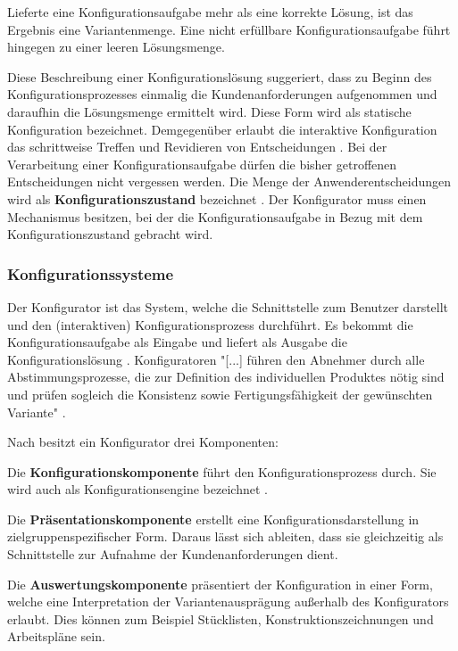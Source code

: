 \documentclass[12pt,a4paper,bibliography=totocnumbered,listof=totoc]{scrartcl}
\begin{document}
Lieferte eine Konfigurationsaufgabe mehr als eine korrekte Lösung, ist das Ergebnis eine Variantenmenge. Eine nicht erfüllbare Konfigurationsaufgabe führt hingegen zu einer leeren Lösungsmenge.

Diese Beschreibung einer Konfigurationslösung suggeriert, dass zu Beginn des Konfigurationsprozesses einmalig die Kundenanforderungen aufgenommen und daraufhin die Lösungsmenge ermittelt wird. Diese Form wird als statische Konfiguration bezeichnet. Demgegenüber erlaubt die interaktive Konfiguration das schrittweise Treffen und Revidieren von Entscheidungen \citep{hadzic04}. Bei der Verarbeitung einer Konfigurationsaufgabe dürfen die bisher getroffenen Entscheidungen nicht vergessen werden. Die Menge der Anwenderentscheidungen wird als \textbf{Konfigurationszustand} bezeichnet \citep{tactonTCsiteDevelopmentManual}. Der Konfigurator muss einen Mechanismus besitzen, bei der die Konfigurationsaufgabe in Bezug mit dem Konfigurationszustand gebracht wird.

\subsubsection{Konfigurationssysteme}
Der Konfigurator ist das System, welche die Schnittstelle zum Benutzer darstellt und den (interaktiven) Konfigurationsprozess durchführt. Es bekommt die Konfigurationsaufgabe als Eingabe und liefert als Ausgabe die Konfigurationslösung \citep{felferning14}. Konfiguratoren "[...] führen den Abnehmer durch alle Abstimmungsprozesse, die zur Definition des individuellen Produktes nötig sind und prüfen sogleich die Konsistenz sowie Fertigungsfähigkeit der gewünschten Variante" \citep{piller06}.

Nach \citet{piller06} besitzt ein Konfigurator drei Komponenten:
\begin{compactitem}
\item Die \textbf{Konfigurationskomponente} führt den Konfigurationsprozess durch. Sie wird auch als Konfigurationsengine bezeichnet \citep{tactonProductOverview}.
\item Die \textbf{Präsentationskomponente} erstellt eine Konfigurationsdarstellung in zielgruppenspezifischer Form. Daraus lässt sich ableiten, dass sie gleichzeitig als Schnittstelle zur Aufnahme der Kundenanforderungen dient.
\item Die \textbf{Auswertungskomponente} präsentiert der Konfiguration in einer Form, welche eine Interpretation der Variantenausprägung außerhalb des Konfigurators erlaubt. Dies können zum Beispiel Stücklisten, Konstruktionszeichnungen und Arbeitspläne sein.
\end{compactitem}
\end{document}
